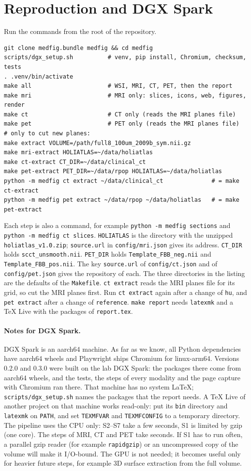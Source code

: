 \documentclass[10pt,a4paper]{article}
\newcommand{\code}[1]{\texttt{#1}}
\begin{document}
\section{Reproduction and DGX Spark}
Run the commands from the root of the repository.
\begin{lstlisting}
git clone medfig.bundle medfig && cd medfig
scripts/dgx_setup.sh          # venv, pip install, Chromium, checksum, tests
. .venv/bin/activate
make all                      # WSI, MRI, CT, PET, then the report
make mri                      # MRI only: slices, icons, web, figures, render
make ct                       # CT only (reads the MRI planes file)
make pet                      # PET only (reads the MRI planes file)
# only to cut new planes:
make extract VOLUME=/path/full8_100um_2009b_sym.nii.gz
make mri-extract HOLIATLAS=~/data/holiatlas
make ct-extract CT_DIR=~/data/clinical_ct
make pet-extract PET_DIR=~/data/rpop HOLIATLAS=~/data/holiatlas
python -m medfig ct extract ~/data/clinical_ct              # = make ct-extract
python -m medfig pet extract ~/data/rpop ~/data/holiatlas   # = make pet-extract
\end{lstlisting}
Each step is also a command, for example \code{python -m medfig sections} and \code{python -m medfig ct slices}.
\code{HOLIATLAS} is the directory with the unzipped \nolinkurl{holiatlas_v1.0.zip}; \code{source.url} in \code{config/mri.json}
gives its address. \code{CT\_DIR} holds \nolinkurl{scct_unsmooth.nii}. \code{PET\_DIR} holds \nolinkurl{Template_FBB_neg.nii} and
\nolinkurl{Template_FBB_pos.nii}. The key \code{source.url} of \code{config/ct.json} and of \code{config/pet.json} gives the
repository of each. The three directories in the listing are the defaults of the \code{Makefile}.
\code{ct extract} reads the MRI planes file for its grid, so cut the MRI planes first. Run \code{ct extract} again after a
change of \code{hu}, and \code{pet extract} after a change of \code{reference}. \code{make report} needs \code{latexmk}
and a TeX Live with the packages of \code{report.tex}.

\paragraph{Notes for DGX Spark.} DGX Spark is an aarch64 machine. As far as we know, all Python dependencies have aarch64 wheels and Playwright ships
Chromium for linux-arm64. Versions 0.2.0 and 0.3.0 were built on the lab DGX Spark: the packages there come from aarch64 wheels,
and the tests, the steps of every modality and the page capture with Chromium ran there. That machine has no system LaTeX;
\code{scripts/dgx\_setup.sh} names the packages that the report needs. A TeX Live of another project on that machine works
read-only: put its \code{bin} directory and \code{latexmk} on \code{PATH}, and set \code{TEXMFVAR} and \code{TEXMFCONFIG} to a
temporary directory. The pipeline uses the CPU only: S2--S7 take a few seconds, S1 is limited by gzip (one core). The steps
of MRI, CT and PET take seconds. If S1 has to run often, a parallel gzip reader (for example \code{rapidgzip}) or an
uncompressed copy of the volume will make it I/O-bound. The GPU is not needed; it becomes useful only for heavier future steps,
for example 3D surface extraction from the full volume.
\end{document}
